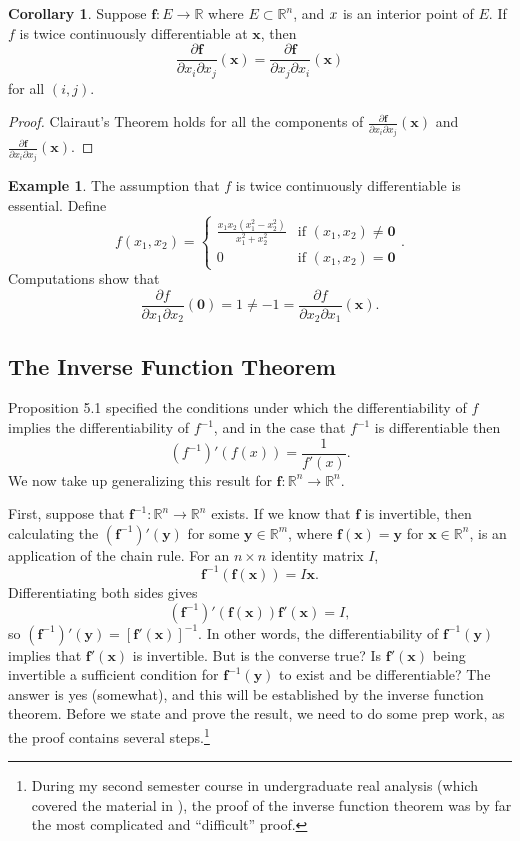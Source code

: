 \documentclass{article}
\newcommand{\R}{\mathbb{R}}
\newcommand{\x}{\mathbf{x}}
\newcommand{\f}{\mathbf{f}}
\newcommand{\y}{\mathbf{y}}
\newcommand{\ze}{\mathbf{0}}
\theoremstyle{definition}
\newtheorem{corollary}{Corollary}[section]
\newtheorem{example}{Example}[section]
\begin{document}
\begin{corollary}
Suppose $ \f:E\to\R $ where $ E\subset \R^n $, and $ \mathbf \x$ is an interior point of $ E $. If $ f $ is twice continuously differentiable at $ \x $, then $$\frac{\partial \f}{\partial x_i\partial x_j}(\x) = \frac{\partial \f}{\partial x_j\partial x_i}(\x)$$ for all $ (i,j) $.  
\end{corollary}
\begin{proof}
	Clairaut's Theorem holds for all the components of $ \frac{\partial \f}{\partial x_i\partial x_j}(\x) $ and $\frac{\partial \f}{\partial x_i\partial x_j}(\x)$.
\end{proof}
\begin{example}
	The assumption that $ f $ is twice continuously differentiable is essential. Define 
	$$f(x_1,x_2)=\begin{cases}
		\frac{x_1x_2(x_1^2-x_2^2)}{x_1^2+x_2^2}&\text{if } (x_1,x_2)\neq \ze\\0&\text{if }(x_1,x_2) = \ze 
	\end{cases}.$$ Computations show that$$ \frac{\partial f}{\partial x_1\partial x_2}(\ze)= 1 \neq -1 = \frac{\partial f}{\partial x_2\partial x_1}(\x).$$
\end{example}
\subsection{The Inverse Function Theorem}
Proposition 5.1 specified the conditions under which the differentiability of $ f $ implies the differentiability of $ f^{-1} $, and in the case that $ f^{-1} $ is differentiable then $$(f^{-1})'(f(x))=\frac{1}{f'(x)}.$$ We now take up generalizing this result for $ \f:\R^n\to\R^n $. 

First, suppose that $ \f^{-1}:\R^n\to\R^n $ exists. If we know that $ \f $ is invertible, then calculating the $ (\f^{-1})'(\y) $ for some $ \y\in\R^m  $, where $ \f(\x)=\y $ for $ \x\in \R^n $, is an application of the chain rule. For an $ n\times n $ identity matrix $ I $, $$\f^{-1}(\f(\x)) = I\x .$$ 
Differentiating both sides gives 
$$ (\f^{-1})'(\f(\x))\f'(\x) = I ,$$
so $ (\f^{-1})'(\y)=[\f'(\x)]^{-1}$. In other words, the differentiability of $ \f^{-1}(\y) $ implies that $ \f'(\x) $ is invertible. But is the converse true? Is $ \f'(\x) $ being invertible a sufficient condition for $ \f^{-1}(\y) $ to exist and be differentiable? The answer is yes (somewhat), and this will be established by the inverse function theorem. Before we state and prove the result, we need to do some prep work, as the proof contains several steps.\footnote{During my second semester course in undergraduate real analysis (which covered the material in \cite{tao2009analysis}), the proof of the inverse function theorem was by far the most complicated and ``difficult'' proof.}
\end{document}
